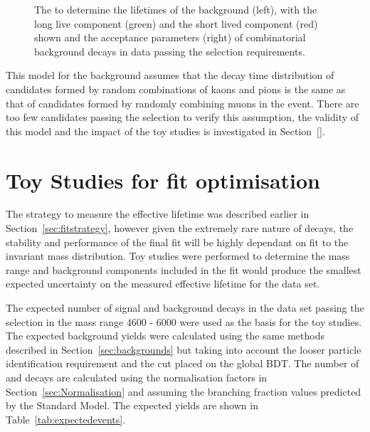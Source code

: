 {\begin{figure}[htbp]
\begin{subfigure}[b]{0.48\textwidth}
   \end{subfigure}
    \caption{The \ml to determine the lifetimes of the background (left), with the long live component (green) and the short lived component (red) shown and the acceptance parameters (right) of combinatorial background decays in data passing the \bhh selection requirements.}
    \label{fig:CBGaccpt}
\end{figure}

This model for the background assumes that the decay time distribution of \bhh candidates formed by random combinations of kaons and pions is the same as that of \bsmumu candidates formed by randomly combining muons in the event. There are too few candidates passing the \bsmumu selection to verify this assumption, the validity of this model and the impact of the toy studies is investigated in Section~\ref{}.%


\section{Toy Studies for fit optimisation}
\label{sec:toys}
The strategy to measure the \bsmumu effective lifetime was described earlier in Section~\ref{sec:fitstrategy}, however given the extremely rare nature of \bsmumu decays, the stability and performance of the final fit will be highly dependant on \ml fit to the invariant mass distribution. Toy studies were performed to determine the mass range and background components included in the \ml fit would produce the smallest expected uncertainty on the measured effective lifetime for the data set. 

The expected number of signal and background decays in the data set passing the \bsmumu selection in the mass range 4600 - 6000 \mevcc were used as the basis for the toy studies. The expected background yields were calculated using the same methods described in Section~\ref{sec:backgrounds} but taking into account the looser particle identification requirement and the cut placed on the global BDT. The number of \bsmumu and \bdmumu decays are calculated using the normalisation factors in Section~\ref{sec:Normalisation} and assuming the branching fraction values predicted by the Standard Model. The expected yields are shown in Table~\ref{tab:expectedevents}. 


}
